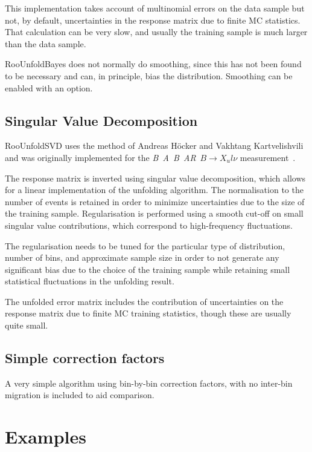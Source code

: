 \documentclass{desyproc}
\newcommand{\babar}{\mbox{\sl B\hspace{-0.4em} {\small\sl A}\hspace{-0.37em} \sl B\hspace{-0.4em} {\small\sl A\hspace{-0.02em}R}}}
\begin{document}
This implementation takes account of multinomial errors on the data sample but not,
by default, uncertainties in the response matrix due to finite MC statistics.
That calculation can be very slow, and usually the training sample is much larger
than the data sample.

RooUnfoldBayes does not normally do smoothing, since this has not been found to be necessary
and can, in principle, bias the distribution. Smoothing can be enabled with an option.

\subsection{Singular Value Decomposition}

RooUnfoldSVD uses the method of Andreas H\"ocker and Vakhtang Kartvelishvili~\cite{Hocker:1995kb}
and was originally implemented for the \babar\ $B \rightarrow X_ul\nu$ measurement~\cite{Tackmann:2008qa}.

The response matrix is inverted using singular value decomposition,
which allows for a linear implementation of the unfolding algorithm.
The normalisation to the number of events is retained in order to minimize
uncertainties due to the size of the training sample.
Regularisation is performed using a smooth cut-off on small singular value contributions,
which correspond to high-frequency fluctuations.

The regularisation needs to be tuned for the particular type of distribution, number of bins, and approximate sample size
in order to not generate any significant bias due to the choice of the training sample
while retaining small statistical fluctuations in the unfolding result.

The unfolded error matrix includes the contribution of uncertainties on the
response matrix due to finite MC training statistics, though these are usually quite small.

\subsection{Simple correction factors}

A very simple algorithm using bin-by-bin correction factors,
with no inter-bin migration is included to aid comparison.

\section{Examples\label{sec:adye:examples}}
\end{document}
